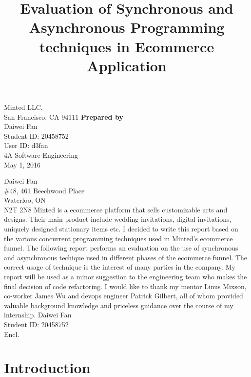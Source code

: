\documentclass[12pt]{article}
\begin{document}
\title{Evaluation of Synchronous and Asynchronous Programming techniques in Ecommerce Application}
{
	Minted LLC.\\
	San Francisco, CA 94111
}
{
	\textbf{Prepared by}\\[2ex]
	
	Daiwei Fan\\
	Student ID: 20458752\\
	User ID: d3fan\\
	4A Software Engineering\\
	May 1, 2016
}


{
	\noindent
	Daiwei Fan\\
	\#48, 461 Beechwood Place\\
	Waterloo, ON\\
	N2T 2N8
}
{
	Minted is a ecommerce platform that sells customizable arts and designs. Their main product include wedding invitations, digital invitations, uniquely designed stationary items etc. I decided to write this report based on the various concurrent programming techniques used in Minted's ecommerce funnel.
}
{
	The following report performs an evaluation on the use of synchronous and asynchronous techique used in different phases of the ecommerce funnel. The correct usage of technique is the interest of many parties in the company. My report will be used as a minor suggestion to the engineering team who makes the final decision of code refactoring.
}
{
	I would like to thank my mentor Linus Mixson, co-worker James Wu and devops engineer Patrick Gilbert, all of whom provided valuable background knowledge and priceless guidance over the course of my internship.
}
{
	Daiwei Fan\\
	Student ID: 20458752\\[2ex]
	Encl.
}






\newpage

\tableofcontents
\newpage
\listoffigures
\newpage
\listoftables
\newpage


\section{Introduction}
\end{document}
